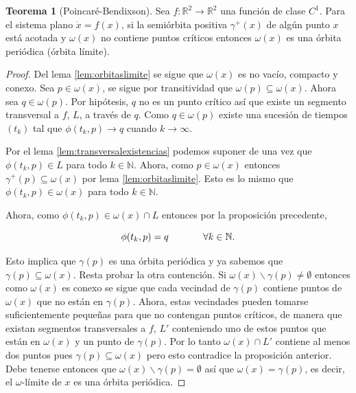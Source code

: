 \documentclass[11pt]{book}
\theoremstyle{definition}
\numberwithin{definition}{section}
\theoremstyle{theorem}
\newtheorem{theorem}{Teorema}
\numberwithin{theorem}{section}
\numberwithin{lemma}{section}
\numberwithin{corollary}{section}
\theoremstyle{plain}
\numberwithin{example}{section}
\newcommand{\N}{{\ensuremath{\mathbb{N}}}}
\newcommand{\R}{{\ensuremath{\mathbb{R}}}}
\begin{document}
\begin{theorem}[Poincaré-Bendixson] \label{teo:poincarebendixson} Sea $f:\R^2 \to \R^2$ una función de clase $C^1$. Para el sistema plano $\dot{x} = f(x)$, si la semiórbita positiva $\gamma^+(x)$ de algún punto $x$ está acotada y $\omega(x)$ no contiene puntos críticos entonces $\omega(x)$ es una órbita periódica (órbita límite).
\end{theorem}

\begin{proof}
Del lema \ref{lem:orbitaslimite} se sigue que $\omega(x)$ es no vacío, compacto y conexo. Sea $p \in \omega(x)$, se sigue por transitividad que $\omega(p) \subseteq \omega(x)$. Ahora sea $q \in \omega(p)$. Por hipótesis, $q$ no es un punto crítico así que existe un segmento transversal a $f$, $L$, a través de $q$.  Como $q \in \omega(p)$ existe una sucesión de tiempos $(t_k)$ tal que $\phi(t_k, p) \to q$ cuando $k \to \infty$.

Por el lema \ref{lem:transversalexistencias} podemos suponer de una vez que $\phi(t_k, p) \in L$ para todo $k \in \N$. Ahora, como $p \in \omega(x)$ entonces $\gamma^+(p) \subseteq \omega(x)$ por lema \ref{lem:orbitaslimite}. Esto es lo mismo que $\phi(t_k, p) \in \omega(x)$ para todo $k \in \N$.

Ahora, como $\phi(t_k, p) \in \omega(x) \cap L$ entonces por la proposición precedente,

$$ \phi(t_k, p) = q  \hspace{0.5in} \forall k \in \N.$$

Esto implica que $\gamma(p)$ es una órbita periódica y ya sabemos que $\gamma(p) \subseteq \omega(x)$. Resta probar la otra contención.
Si $\omega(x) \backslash \gamma(p) \neq \emptyset$ entonces como $\omega(x)$ es conexo se sigue que cada vecindad de $\gamma(p)$ contiene puntos de $\omega(x)$ que no están en $\gamma(p)$.
Ahora, estas vecindades pueden tomarse suficientemente pequeñas para que no contengan puntos críticos, de manera que existan segmentos transversales a $f$, $L'$ conteniendo uno de estos puntos que están en $\omega(x)$ y un punto de $\gamma(p)$. Por lo tanto $\omega(x) \cap L'$ contiene al menos dos puntos pues $\gamma(p) \subseteq \omega(x)$ pero esto contradice la proposición anterior.
Debe tenerse entonces que $\omega(x) \backslash \gamma(p) = \emptyset$ así que $\omega(x) = \gamma(p)$, es decir, el $\omega$-límite de $x$ es una órbita periódica.

\end{proof}
\end{document}

